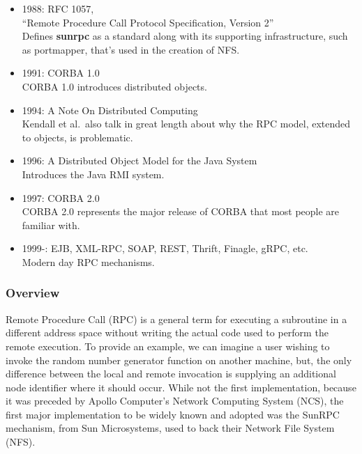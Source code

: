 \begin{itemize}
\item{1988:} RFC 1057, \\ ``Remote Procedure Call Protocol Specification, Version 2'' \\
	Defines \textbf{sunrpc} as a standard along with its supporting infrastructure, such as portmapper, that's used in the creation of NFS.

\item{1991:} CORBA 1.0 \\
	CORBA 1.0 introduces distributed objects.
	
\item{1994:} A Note On Distributed Computing~\cite{kendall1994note} \\
	Kendall et al.\ also talk in great length about why the RPC model, extended to objects, is problematic.

\item{1996:} A Distributed Object Model for the Java System~\cite{wollrath1996distributed} \\
	Introduces the Java RMI system.

\item{1997:} CORBA 2.0 \\
	CORBA 2.0 represents the major release of CORBA that most people are familiar with.

\item{1999-:} EJB, XML-RPC, SOAP, REST, Thrift, Finagle, gRPC, etc. \\
	Modern day RPC mechanisms.

\end{itemize}

\subsubsection{Overview}

Remote Procedure Call (RPC) is a general term for executing a subroutine in a different address space without writing the actual code used to perform the remote execution.	To provide an example, we can imagine a user wishing to invoke the random number generator function on another machine, but, the only difference between the local and remote invocation is supplying an additional node identifier where it should occur.  While not the first implementation, because it was preceded by Apollo Computer's Network Computing System (NCS), the first major implementation to be widely known and adopted was the SunRPC mechanism, from Sun Microsystems, used to back their Network File System (NFS).

